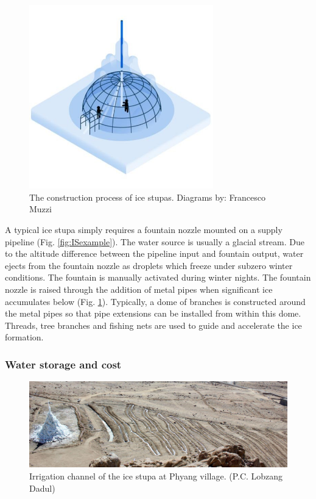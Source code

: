 \begin{figure}[htb]
	\centering
	\includegraphics[width=8cm]{figs/IS_science.jpg}
	\caption{The construction process of ice stupas. Diagrams by: Francesco Muzzi }
	\label{fig:ISconstruction}
\end{figure}

A typical ice stupa simply requires a fountain nozzle mounted on a supply pipeline (Fig. \ref{fig:ISexample}).
The water source is usually a glacial stream. Due to the altitude difference between the pipeline input and
fountain output, water ejects from the fountain nozzle as droplets which freeze under subzero winter conditions.
The fountain is manually activated during winter nights. The fountain nozzle is raised through the addition of
metal pipes when significant ice accumulates below (Fig. \ref{fig:ISconstruction}). Typically, a dome of
branches is constructed around the metal pipes so that pipe extensions can be installed from within this dome.
Threads, tree branches and fishing nets are used to guide and accelerate the ice formation.

\subsubsection{Water storage and cost}

\begin{figure}[htb]
	\centering
	\includegraphics[width=\textwidth]{figs/IS_irrigation.jpeg}
	\caption{Irrigation channel of the ice stupa at Phyang village. (P.C. Lobzang Dadul) }
	\label{fig:ISirrigation}
\end{figure}

